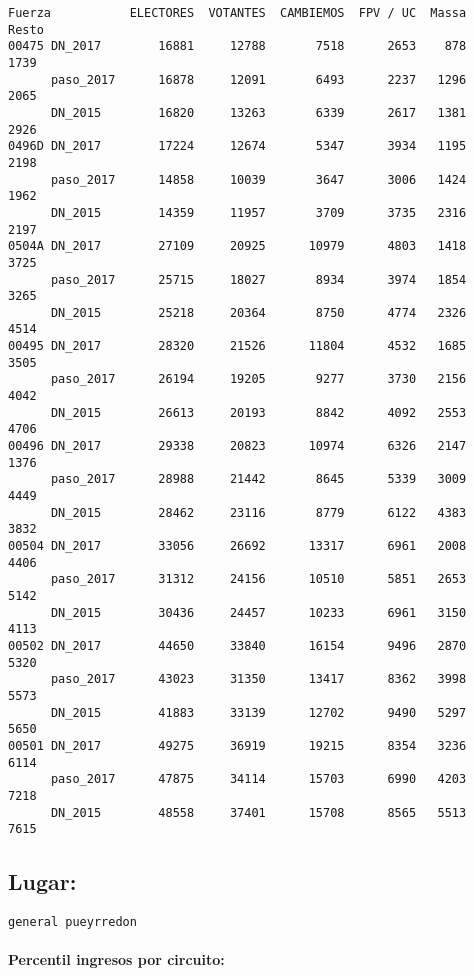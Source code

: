 \documentclass[11pt]{article}
\begin{document}
    \begin{verbatim}
Fuerza           ELECTORES  VOTANTES  CAMBIEMOS  FPV / UC  Massa  Resto
00475 DN_2017        16881     12788       7518      2653    878   1739
      paso_2017      16878     12091       6493      2237   1296   2065
      DN_2015        16820     13263       6339      2617   1381   2926
0496D DN_2017        17224     12674       5347      3934   1195   2198
      paso_2017      14858     10039       3647      3006   1424   1962
      DN_2015        14359     11957       3709      3735   2316   2197
0504A DN_2017        27109     20925      10979      4803   1418   3725
      paso_2017      25715     18027       8934      3974   1854   3265
      DN_2015        25218     20364       8750      4774   2326   4514
00495 DN_2017        28320     21526      11804      4532   1685   3505
      paso_2017      26194     19205       9277      3730   2156   4042
      DN_2015        26613     20193       8842      4092   2553   4706
00496 DN_2017        29338     20823      10974      6326   2147   1376
      paso_2017      28988     21442       8645      5339   3009   4449
      DN_2015        28462     23116       8779      6122   4383   3832
00504 DN_2017        33056     26692      13317      6961   2008   4406
      paso_2017      31312     24156      10510      5851   2653   5142
      DN_2015        30436     24457      10233      6961   3150   4113
00502 DN_2017        44650     33840      16154      9496   2870   5320
      paso_2017      43023     31350      13417      8362   3998   5573
      DN_2015        41883     33139      12702      9490   5297   5650
00501 DN_2017        49275     36919      19215      8354   3236   6114
      paso_2017      47875     34114      15703      6990   4203   7218
      DN_2015        48558     37401      15708      8565   5513   7615
    \end{verbatim}

    
    \hypertarget{lugar}{%
\subsection{Lugar:}\label{lugar}}

    
    \begin{Verbatim}[commandchars=\\\{\}]
general pueyrredon

    \end{Verbatim}

    \hypertarget{percentil-ingresos-por-circuito}{%
\paragraph{Percentil ingresos por
circuito:}\label{percentil-ingresos-por-circuito}}
\end{document}
